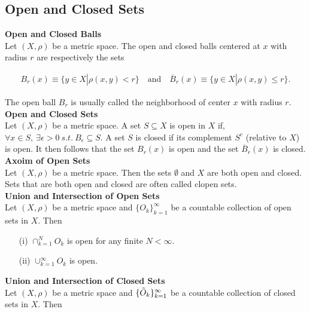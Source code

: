 \documentclass{article}
\numberwithin{theorem}{subsection}
\numberwithin{theorem}{subsubsection}
\numberwithin{lemma}{subsection}
\numberwithin{lemma}{subsubsection}
\theoremstyle{definition}
\numberwithin{definition}{subsection}
\numberwithin{definition}{subsubsection}
\begin{document}
\subsection{Open and Closed Sets}

\noindent \textbf{Open and Closed Balls} \\
\indent Let $(X,\rho)$ be a metric space. The open and closed balls centered at $x$ with radius $r$ are respectively the sets

\begin{gather*}
    B_{r} (x) \equiv \{y \in X | \rho (x,y) < r\} \quad \text{and} \quad \overline{B}_{r} (x) \equiv \{y \in X | \rho (x,y) \leq r\}.
\end{gather*}

\noindent The open ball $B_{r}$ is usually called the neighborhood of center $x$ with radius $r$.
\\

\noindent \textbf{Open and Closed Sets} \\
\indent Let $(X, \rho)$ be a metric space. A set $S \subseteq X$ is open in $X$ if, $\forall x \in S,\ \exists \epsilon > 0\ s.t.\ B_{\epsilon} \subseteq S$. A set $S$ is closed if its complement $S^{c}$ (relative to $X$) is open. It then follows that the set $B_{r}(x)$ is open and the set $\overline{B}_{r}(x)$ is closed.
\\

\noindent \textbf{Axoim of Open Sets} \\
\indent Let $(X, \rho)$ be a metric space. Then the sets $\emptyset$ and $X$ are both open and closed. Sets that are both open and closed are often called clopen sets.
\\

\noindent \textbf{Union and Intersection of Open Sets} \\
\indent Let $(X, \rho)$ be a metric space and $\{O_{k}\}_{k=1}^{\infty}$ be a countable collection of open sets in $X$. Then

\begin{itemize}
    \item[(i)] $\cap_{k=1}^{N} O_{k}$ is open for any finite $N < \infty$.
    \item[(ii)] $\cup_{k=1}^{\infty} O_{k}$ is open.
\end{itemize}

\noindent \textbf{Union and Intersection of Closed Sets} \\
\indent Let $(X, \rho)$ be a metric space and $\{\Tilde{O}_{k}\}_{k=1}^{\infty}$ be a countable collection of closed sets in $X$. Then
\end{document}
